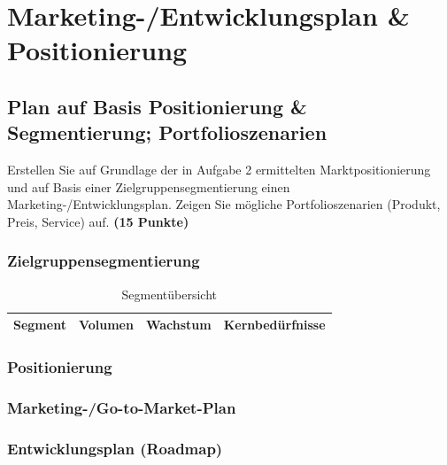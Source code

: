 \documentclass[
%
ngerman %
%
numeric %
]{wbh-assignment}
\begin{document}
\section{Marketing-/Entwicklungsplan \& Positionierung}
\label{sec:marketing_plan}

\subsection{Plan auf Basis Positionierung \& Segmentierung; Portfolioszenarien}
\begin{aufgabenstellung}
Erstellen Sie auf Grundlage der in Aufgabe 2 ermittelten Marktpositionierung und auf Basis einer Zielgruppensegmentierung einen Marketing-/Entwicklungsplan. Zeigen Sie mögliche Portfolioszenarien (Produkt, Preis, Service) auf. \textbf{(15 Punkte)}
\end{aufgabenstellung}

\vspace*{5mm}

\subsubsection{Zielgruppensegmentierung}
\begin{table}[htb!]
\centering
\caption{Segmentübersicht}
\begin{tabular}{l r r l}
\textbf{Segment} & \textbf{Volumen} & \textbf{Wachstum} & \textbf{Kernbedürfnisse} \\
\hline
\end{tabular}
\end{table}

\subsubsection{Positionierung}

\subsubsection{Marketing-/Go-to-Market-Plan}

\subsubsection{Entwicklungsplan (Roadmap)}
\end{document}
